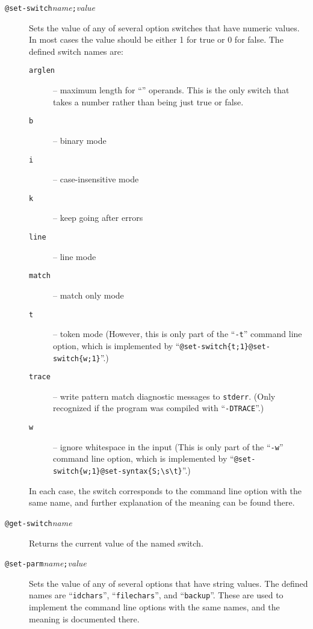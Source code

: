 \begin{description}
\item[{\tt @set-switch\ttlb}{\it name}{\tt ;}{\it value}{\tt \ttrb}]
Sets the value of any of several option switches that have numeric values.
In most cases the value should be either 1 for true or 0 for false.
The defined switch names are:
\begin{description}
\item[\tt arglen] -- maximum length for ``{\tt *}'' operands.  This is
the only switch that takes a number rather than being just true or false.
\item[\tt b] -- binary mode
\item[\tt i] -- case-insensitive mode
\item[\tt k] -- keep going after errors
\item[\tt line] -- line mode
\item[\tt match] -- match only mode
\item[\tt t] -- token mode
(However, this is only part of the ``\verb/-t/'' command line option,
which is implemented by
``\verb/@set-switch{t;1}@set-switch{w;1}/''.)
\item[\tt trace] -- write pattern match diagnostic messages to {\tt stderr}.
  (Only recognized if the program was compiled with ``\verb/-DTRACE/''.)
\item[\tt w] -- ignore whitespace in the input
(This is only part of the ``\verb/-w/'' command line option, which is
implemented by
``\verb/@set-switch{w;1}@set-syntax{S;\s\t}/''.)
\end{description}
In each case, the switch corresponds to the command line option with the
same name, and further explanation of the meaning can be found there.

\item[{\tt @get-switch\ttlb}{\it name}{\tt \ttrb}]
Returns the current value of the named switch.

\item[{\tt @set-parm\ttlb}{\it name}{\tt ;}{\it value}{\tt \ttrb}]
Sets the value of any of several options that have string values.
The defined names are ``\verb/idchars/'', ``\verb/filechars/'', and
``\verb/backup/''.  These are used to implement the command line options
with the same names, and the meaning is documented there.


\end{description}
